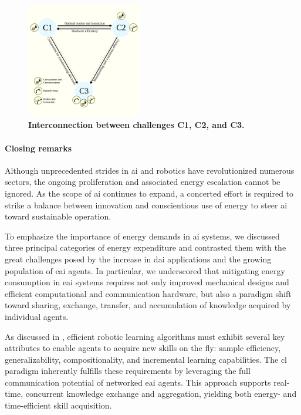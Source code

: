 \documentclass[12pt]{article}
\begin{document}
\begin{figure}[!t]
	\centering
	\includegraphics[width=0.45\textwidth]{fig/grand_challenges_connections.png}
	\caption{\textbf{Interconnection between challenges C1, C2, and C3.}}
	\label{fig:challengesConnected}
\end{figure}

\paragraph*{Closing remarks}
Although unprecedented strides in \ac{ai} and robotics have revolutionized numerous sectors, the ongoing proliferation and associated energy escalation cannot be ignored. As the scope of \ac{ai} continues to expand, a concerted effort is required to strike a balance between innovation and conscientious use of energy to steer \ac{ai} toward sustainable operation.

To emphasize the importance of energy demands in \ac{ai} systems, we discussed three principal categories of energy expenditure and contrasted them with the great challenges posed by the increase in \acl{dai} applications and the growing population of \ac{eai} agents. In particular, we underscored that mitigating energy consumption in \ac{eai} systems requires not only improved mechanical designs and efficient computational and communication hardware, but also a paradigm shift toward sharing, exchange, transfer, and accumulation of knowledge acquired by individual agents.

As discussed in \cite{Kaelbling2020foundationefficientrobot}, efficient robotic learning algorithms must exhibit several key attributes to enable agents to acquire new skills on the fly: sample efficiency, generalizability, compositionality, and incremental learning capabilities. The \acl{cl} paradigm inherently fulfills these requirements by leveraging the full communication potential of networked \ac{eai} agents. This approach supports real-time, concurrent knowledge exchange and aggregation, yielding both energy- and time-efficient skill acquisition.
\end{document}
